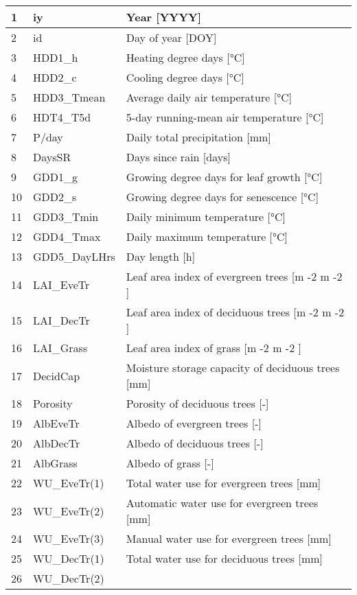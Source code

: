 \documentclass[letterpaper,10pt,english]{sphinxmanual}
\begin{document}
\begin{savenotes}
\begin{longtable}{|l|l|l|}
1
&
iy
&
Year {[}YYYY{]}
\\
\hline
2
&
id
&
Day of year {[}DOY{]}
\\
\hline
3
&
HDD1\_h
&
Heating degree days {[}°C{]}
\\
\hline
4
&
HDD2\_c
&
Cooling degree days {[}°C{]}
\\
\hline
5
&
HDD3\_Tmean
&
Average daily air temperature {[}°C{]}
\\
\hline
6
&
HDT4\_T5d
&
5-day running-mean air temperature {[}°C{]}
\\
\hline
7
&
P/day
&
Daily total precipitation {[}mm{]}
\\
\hline
8
&
DaysSR
&
Days since rain {[}days{]}
\\
\hline
9
&
GDD1\_g
&
Growing degree days for leaf growth {[}°C{]}
\\
\hline
10
&
GDD2\_s
&
Growing degree days for senescence {[}°C{]}
\\
\hline
11
&
GDD3\_Tmin
&
Daily minimum temperature {[}°C{]}
\\
\hline
12
&
GDD4\_Tmax
&
Daily maximum temperature {[}°C{]}
\\
\hline
13
&
GDD5\_DayLHrs
&
Day length {[}h{]}
\\
\hline
14
&
LAI\_EveTr
&
Leaf area index of evergreen trees {[}m -2 m -2 {]}
\\
\hline
15
&
LAI\_DecTr
&
Leaf area index of deciduous trees {[}m -2 m -2 {]}
\\
\hline
16
&
LAI\_Grass
&
Leaf area index of grass {[}m -2 m -2 {]}
\\
\hline
17
&
DecidCap
&
Moisture storage capacity of deciduous trees {[}mm{]}
\\
\hline
18
&
Porosity
&
Porosity of deciduous trees {[}-{]}
\\
\hline
19
&
AlbEveTr
&
Albedo of evergreen trees {[}-{]}
\\
\hline
20
&
AlbDecTr
&
Albedo of deciduous trees {[}-{]}
\\
\hline
21
&
AlbGrass
&
Albedo of grass {[}-{]}
\\
\hline
22
&
WU\_EveTr(1)
&
Total water use for evergreen trees {[}mm{]}
\\
\hline
23
&
WU\_EveTr(2)
&
Automatic water use for evergreen trees {[}mm{]}
\\
\hline
24
&
WU\_EveTr(3)
&
Manual water use for evergreen trees {[}mm{]}
\\
\hline
25
&
WU\_DecTr(1)
&
Total water use for deciduous trees {[}mm{]}
\\
\hline
26
&
WU\_DecTr(2)

\end{longtable}
\end{savenotes}
\end{document}
